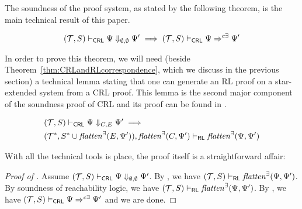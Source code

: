 The soundness of the proof system, as stated by the following theorem, is the main
technical result of this paper.

\begin{theorem}\label{thm:proofsystemSoundness}
\begin{equation*}
    (\mathcal{T}, S) \vdash_{\mathsf{CRL}} \Psi \Downarrow_{\emptyset,\emptyset} \Psi^\prime \implies
    (\mathcal{T}, S) \vDash_{\mathsf{CRL}} \Psi \Rightarrow^{c\exists} \Psi^\prime
\end{equation*}
\end{theorem}

In order to  prove this theorem, we will need (beside
Theorem~\ref{thm:CRLandRLcorrespondence}, which we discuss in the previous
section) a technical lemma stating that one can generate an RL proof on a star-extended system
from a CRL proof. This lemma is the second major component of the soundness
proof of CRL and its proof can be found in .
\begin{lemma}\label{lem:CRLalmostSoundness}
    \begin{align*}
        & (\mathcal{T}, S) \vdash_{\mathsf{CRL}} \Psi \Downarrow_{C,E} \Psi^\prime \implies \\
        &
        (\mathcal{T}^*, S^* \cup \mathit{flatten}^\exists(E, \Psi^\prime)), \mathit{flatten}^\exists(C, \Psi^\prime) \vdash_{\mathsf{RL}}
          \mathit{flatten}^\exists(\Psi, \Psi^\prime) 
    \end{align*}
\end{lemma}

\noindent With all the technical tools is place, the proof itself is a straightforward affair:
\begin{proof}[Proof of ]
Assume $(\mathcal{T}, S) \vdash_{\mathsf{CRL}} \Psi \Downarrow_{\emptyset,\emptyset} \Psi^\prime$.
By , we have $(\mathcal{T}, S) \vdash_{\mathsf{RL}} \mathit{flatten}^\exists(\Psi, \Psi^\prime)$.
By soundness of reachability logic, we have $(\mathcal{T}, S) \vDash_{\mathsf{RL}} \mathit{flatten}^\exists(\Psi, \Psi^\prime)$.
By , 
we have $(\mathcal{T}, S) \vDash_{\mathsf{CRL}} \Psi \Rightarrow^{c\exists} \Psi^\prime$ and we are done.
\end{proof}




